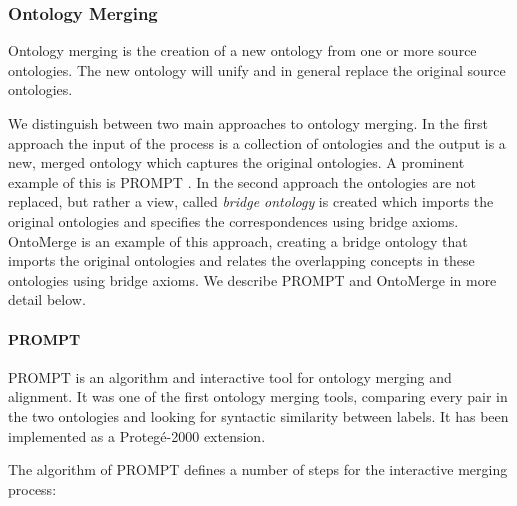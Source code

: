 \subsubsection{Ontology Merging}
\label{subsec:mediationapproaches_ontologymerging}
Ontology merging is the creation of a new ontology from one or more
source ontologies. The new ontology will unify and in general replace
the original source ontologies. 

We distinguish between two main approaches to ontology merging. In the
first approach the input of the process is a collection of ontologies
and the output is a new, merged ontology which captures the original
ontologies. A prominent example of this is PROMPT \cite{noy2000prompt}. 
In the second approach the ontologies are not replaced, but
rather a {\textquotesingle}view{\textquotesingle}, called
\textit{bridge ontology} is created which imports the original
ontologies and specifies the correspondences using bridge axioms.
OntoMerge \cite{dou2002ontology_translation} is an example of this approach, creating a
bridge ontology that imports the original ontologies and relates the
overlapping concepts in these ontologies using bridge axioms. We
describe PROMPT and OntoMerge in more detail below. 

\paragraph{PROMPT}
\label{subsubsec:mediationapproaches_ontologymerging_PROMPT}
PROMPT \cite{noy2000prompt} is an algorithm and interactive tool for
ontology merging and alignment. It was one of the first ontology
merging tools, comparing every pair in the two ontologies and looking
for syntactic similarity between labels. It has been implemented as a
Proteg\'e-2000 extension. 

The algorithm of PROMPT defines a number of steps for the interactive
merging process: 

